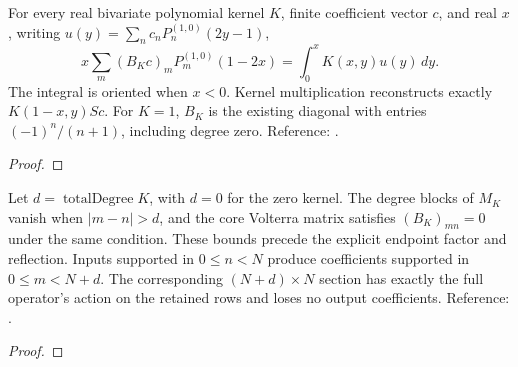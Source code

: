 \begin{supporting}
\begin{theorem}
\label{thm:volterra-coefficient-exact}
\leanok
For every real bivariate polynomial kernel $K$, finite coefficient vector $c$,
and real $x$, writing $u(y)=\sum_n c_nP_n^{(1,0)}(2y-1)$,
\[
 x\sum_m(B_Kc)_m P_m^{(1,0)}(1-2x)=\int_0^x K(x,y)u(y)\,dy.
\]
The integral is oriented when $x<0$. Kernel multiplication reconstructs exactly
$K(1-x,y)Sc$. For $K=1$, $B_K$ is the existing diagonal with entries
$(-1)^n/(n+1)$, including degree zero.
Reference: \cite[Sections 3.1--3.2]{gutleb-olver}.
\end{theorem}
\begin{proof}
\leanok
\end{proof}
\end{supporting}


\begin{theorem}
\label{thm:volterra-coefficient-bandwidth}
\leanok
Let $d=\operatorname{totalDegree}K$, with $d=0$ for the zero kernel.
The degree blocks of $M_K$ vanish when $|m-n|>d$, and the core Volterra matrix
satisfies $(B_K)_{mn}=0$ under the same condition. These bounds precede the
explicit endpoint factor and reflection. Inputs supported in $0\le n<N$
produce coefficients supported in $0\le m<N+d$. The corresponding
$(N+d)\times N$ section has exactly the full operator's action on the retained
rows and loses no output coefficients.
Reference: \cite[Sections 3.1--3.2]{gutleb-olver}.
\end{theorem}
\begin{proof}
\leanok
\end{proof}



